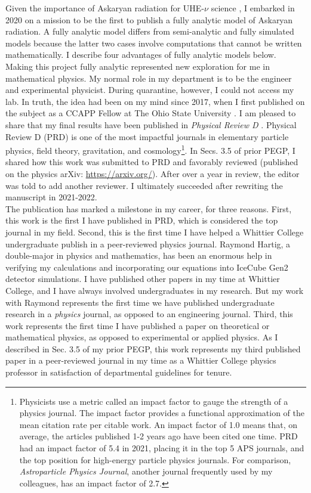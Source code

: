 \documentclass[../../../main.tex]{subfiles}
\begin{document}
Given the importance of Askaryan radiation for UHE-$\nu$ science \cite{Askaryan:1962hbi,1962JPSJS..17C.257A,ask1,ask2,PhysRevLett.86.2802,PhysRevLett.99.171101,PhysRevD.101.083005}, I embarked in 2020 on a mission to be the first to publish a fully analytic model of Askaryan radiation.  A fully analytic model differs from semi-analytic and fully simulated models because the latter two cases involve computations that cannot be written mathematically.  I describe four advantages of fully analytic models below.  Making this project fully analytic represented new exploration for me in mathematical physics.  My normal role in my department is to be the engineer and experimental physicist.  During quarantine, however, I could not access my lab.  In truth, the idea had been on my mind since 2017, when I first published on the subject as a CCAPP Fellow at The Ohio State University \cite{10.1016/j.astropartphys.2017.03.008}.  I am pleased to share that my final results have been published in \textit{Physical Review D} \cite{PhysRevD.105.123019}.  Physical Review D (PRD) is one of the most impactful journals in elementary particle physics, field theory, gravitation, and cosmology\footnote{Physicists use a metric called an impact factor to gauge the strength of a physics journal.  The impact factor provides a functional approximation of the mean citation rate per citable work.  An impact factor of 1.0 means that, on average, the articles published 1-2 years ago have been cited one time.  PRD had an impact factor of 5.4 in 2021, placing it in the top 5 APS journals, and the top position for high-energy particle physics journals.  For comparison, \textit{Astroparticle Physics Journal}, another journal frequently used by my colleagues, has an impact factor of 2.7.}.  In Secs. 3.5 of prior PEGP, I shared how this work was submitted to PRD and favorably reviewed (published on the physics arXiv: \url{https://arxiv.org/}).  After over a year in review, the editor was told to add another reviewer.  I ultimately succeeded after rewriting the manuscript in 2021-2022.
\\
\vspace{0.25cm}
The publication has marked a milestone in my career, for three reasons.  First, this work is the first I have published in PRD, which is considered the top journal in my field.  Second, this is the first time I have helped a Whittier College undergraduate publish in a peer-reviewed physics journal.  Raymond Hartig, a double-major in physics and mathematics, has been an enormous help in verifying my calculations and incorporating our equations into IceCube Gen2 detector simulations.  I have published other papers in my time at Whittier College, and I have always involved undergraduates in my research.  But my work with Raymond represents the first time we have published undergraduate research in a \textit{physics} journal, as opposed to an engineering journal.  Third, this work represents the first time I have published a paper on theoretical or mathematical physics, as opposed to experimental or applied physics.  As I described in Sec. 3.5 of my prior PEGP, this work represents my third published paper in a peer-reviewed journal in my time as a Whittier College physics professor in satisfaction of departmental guidelines for tenure.
\end{document}
